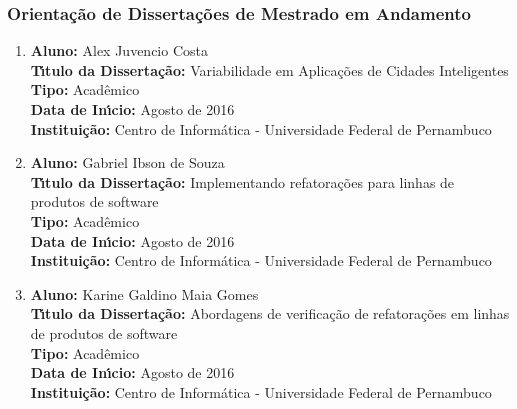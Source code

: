 \documentclass[a4paper,oneside,10pt]{article}
\begin{document}

\subsubsection{Orienta\c{c}\~{a}o de Disserta\c{c}\~{o}es de Mestrado em Andamento}
\vspace{0.3cm}

\begin{enumerate}
\renewcommand{\labelenumi}{{\large\bfseries\arabic{enumi}.}}

\item       \textbf{Aluno:} Alex Juvencio Costa \mbox{}\\
            \textbf{T\'{\i}tulo da Disserta\c{c}\~{a}o:} Variabilidade em Aplicações de Cidades Inteligentes\\
            \textbf{Tipo:} Acadêmico \\%
            \textbf{Data de In\'{\i}cio:} Agosto de 2016\\
            \textbf{Institui\c{c}\~{a}o:} Centro de Informática - Universidade Federal de Pernambuco

\item       \textbf{Aluno:} Gabriel Ibson de Souza \mbox{}\\
            \textbf{T\'{\i}tulo da Disserta\c{c}\~{a}o:} Implementando refatorações para linhas de produtos de software\\
            \textbf{Tipo:} Acadêmico\\
            \textbf{Data de In\'{\i}cio:} Agosto de 2016\\
            \textbf{Institui\c{c}\~{a}o:} Centro de Informática - Universidade Federal de Pernambuco

\item       \textbf{Aluno:} Karine Galdino Maia Gomes \mbox{}\\
            \textbf{T\'{\i}tulo da Disserta\c{c}\~{a}o:} Abordagens de verificação de refatorações em linhas de produtos de software\\
            \textbf{Tipo:} Acadêmico\\
            \textbf{Data de In\'{\i}cio:} Agosto de 2016\\
            \textbf{Institui\c{c}\~{a}o:} Centro de Informática - Universidade Federal de Pernambuco


\end{enumerate}
\end{document}
